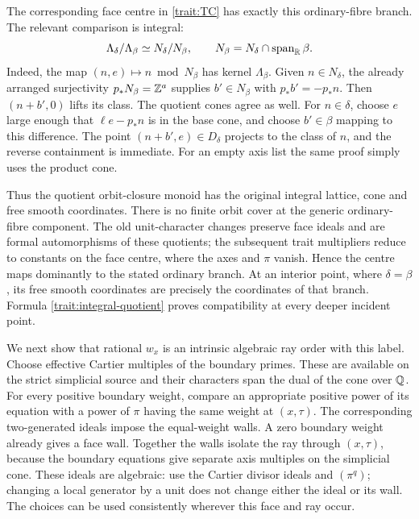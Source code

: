 The corresponding face centre in \eqref{trait:TC} has exactly this
ordinary-fibre branch.  The relevant comparison is integral:
\begin{equation}
 \Lambda_\delta/\Lambda_\beta\simeq N_\delta/N_\beta,
 \qquad
 N_\beta=N_\delta\cap\operatorname{span}_{\mathbb R}\beta.
 \label{trait:integral-quotient}
\end{equation}
Indeed, the map \((n,e)\mapsto n\bmod N_\beta\) has kernel
\(\Lambda_\beta\).  Given \(n\in N_\delta\), the already arranged
surjectivity \(p_*N_\beta=\mathbb Z^a\) supplies \(b'\in N_\beta\)
with \(p_*b'=-p_*n\).  Then \((n+b',0)\) lifts its class.  The
quotient cones agree as well.  For \(n\in\delta\), choose \(e\)
large enough that \(\ell e-p_*n\) is in the base cone, and choose
\(b'\in\beta\) mapping to this difference.  The point
\((n+b',e)\in D_\delta\) projects to the class of \(n\), and
the reverse containment is immediate.  For an empty axis list
the same proof simply uses the product cone.

Thus the quotient orbit-closure monoid has the original integral
lattice, cone and free smooth coordinates.  There is no finite
orbit cover at the generic ordinary-fibre component.  The old
unit-character changes preserve face ideals and are formal
automorphisms of these quotients; the subsequent trait
multipliers reduce to constants on the face centre, where the
axes and \(\pi\) vanish.  Hence the centre maps dominantly to
the stated ordinary branch.  At an interior point, where
\(\delta=\beta\), its free smooth coordinates are precisely
the coordinates of that branch.  Formula
\eqref{trait:integral-quotient} proves compatibility at every
deeper incident point.

We next show that rational \(w_x\) is an intrinsic algebraic ray
order with this label.  Choose effective Cartier multiples of
the boundary primes.  These are available on the strict
simplicial source and their characters span the dual of the
cone over \(\mathbb Q\).  For every positive boundary weight, compare
an appropriate positive power of its equation with a power of
\(\pi\) having the same weight at \((x,\tau)\).  The corresponding
two-generated ideals impose the equal-weight walls.  A zero
boundary weight already gives a face wall.  Together the walls
isolate the ray through \((x,\tau)\), because the boundary
equations give separate axis multiples on the simplicial cone.
These ideals are algebraic: use the Cartier divisor ideals
and \((\pi^q)\); changing a local generator by a unit does not
change either the ideal or its wall.  The choices can be used
consistently wherever this face and ray occur.

